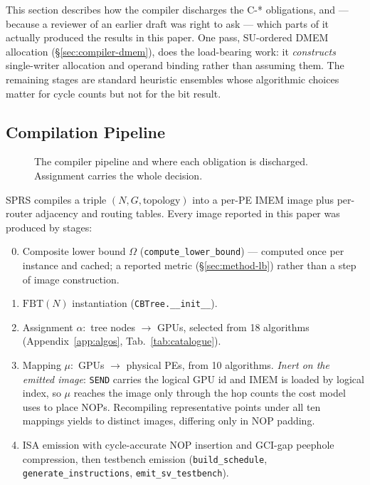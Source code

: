 \documentclass[journal,10pt]{IEEEtran}
\theoremstyle{plain}
\theoremstyle{definition}
\theoremstyle{remark}
\newcommand{\FBT}{\ensuremath{\mathrm{FBT}}}
\newcommand{\sprs}{\textsc{SPRS}}
\newcommand{\sv}[1]{\texttt{#1}}
\newcommand{\asgn}{\ensuremath{\alpha}}
\newcommand{\map}{\ensuremath{\mu}}
\begin{document}
This section describes how the compiler discharges the \textsf{C-*}
obligations, and --- because a reviewer of an earlier draft was right to ask
--- which parts of it actually produced the results in this paper. One pass,
SU-ordered DMEM allocation (\S\ref{sec:compiler-dmem}), does the
load-bearing work: it \emph{constructs} single-writer allocation and operand
binding rather than assuming them. The remaining stages are standard
heuristic ensembles whose algorithmic choices matter for cycle counts but
not for the bit result.

\subsection{Compilation Pipeline}\label{sec:compiler-pipeline}

\begin{figure}[!t]\centering

\caption{The compiler pipeline and where each obligation is discharged. Assignment carries the whole decision.}\label{fig:compiler}
\end{figure}


\sprs{} compiles a triple $(N, G, \text{topology})$ into a per-PE IMEM
image plus per-router adjacency and routing tables. Every image reported in
this paper was produced by \StagesRun{} stages:

\begin{enumerate}[label=\textbf{S\arabic*},leftmargin=2.5em]
\setcounter{enumi}{-1}
\item Composite lower bound $\Omega$ (\sv{compute\_lower\_bound}) ---
  computed once per instance and cached; a reported metric
  (\S\ref{sec:method-lb}) rather than a step of image construction.
\item $\FBT(N)$ instantiation (\sv{CBTree.\_\_init\_\_}).
\item Assignment $\asgn:$ tree nodes $\to$ GPUs, selected from 18
  algorithms (Appendix~\ref{app:algos}, Tab.~\ref{tab:catalogue}).
\setcounter{enumi}{2}
\item Mapping $\map:$ GPUs $\to$ physical PEs, from 10 algorithms.
  \emph{Inert on the emitted image}: \texttt{SEND} carries the logical GPU
  id and IMEM is loaded by logical index, so $\map$ reaches the image only
  through the hop counts the cost model uses to place NOPs. Recompiling
  \MapPoints{} representative points under all ten mappings yields
  \MapImagesLo{} to \MapImagesHi{} distinct images, differing only in NOP
  padding.
\setcounter{enumi}{5}
\item ISA emission with cycle-accurate NOP insertion and GCI-gap peephole
  compression, then testbench emission (\sv{build\_schedule},
  \sv{generate\_instructions}, \sv{emit\_sv\_testbench}).
\end{enumerate}
\end{document}

